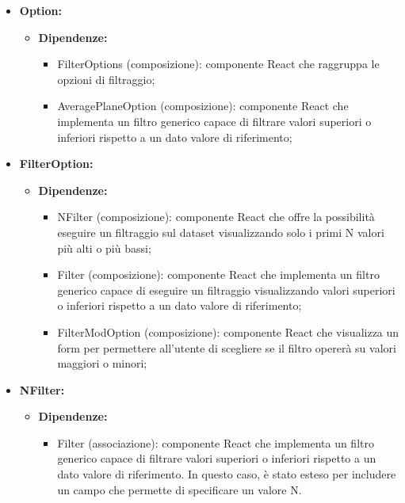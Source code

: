 \begin{itemize}
    \item \textbf{Option:}
    \begin{itemize}
        \item \textbf{Dipendenze:}
        \begin{itemize}
            \item FilterOptions (composizione): componente React che raggruppa le opzioni di filtraggio;
            \item AveragePlaneOption (composizione): componente React che implementa un filtro generico capace di filtrare valori superiori o inferiori rispetto a un dato valore di riferimento;
        \end{itemize} 
    \end{itemize}

    \item \textbf{FilterOption:}
    \begin{itemize}
        \item \textbf{Dipendenze:}
        \begin{itemize}
            \item NFilter (composizione): componente React che offre la possibilità eseguire un filtraggio sul dataset visualizzando solo i primi N valori più alti o più bassi;
            \item Filter (composizione): componente React che implementa un filtro generico capace di  eseguire un filtraggio visualizzando valori superiori o inferiori rispetto a un dato valore di riferimento;
            \item FilterModOption (composizione): componente React che visualizza un form per permettere all'utente di scegliere se il filtro opererà su valori maggiori o minori;
        \end{itemize} 
    \end{itemize}

    \item \textbf{NFilter:}
    \begin{itemize}
        \item \textbf{Dipendenze:}
        \begin{itemize}
            \item Filter (associazione): componente React che implementa un filtro generico capace di filtrare valori superiori o inferiori rispetto a un dato valore di riferimento.
            In questo caso, è stato esteso per includere un campo che permette di specificare un valore N.
        \end{itemize} 
    \end{itemize}
\end{itemize}

